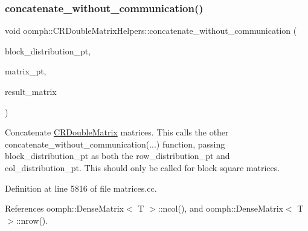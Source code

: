 \subsubsection{\texorpdfstring{concatenate\+\_\+without\+\_\+communication()}{concatenate\_without\_communication()}\hspace{0.1cm}{\footnotesize\ttfamily [2/2]}}
{\footnotesize\ttfamily void oomph\+::\+C\+R\+Double\+Matrix\+Helpers\+::concatenate\+\_\+without\+\_\+communication (\begin{DoxyParamCaption}\item[{const \hyperlink{classoomph_1_1Vector}{Vector}$<$ \hyperlink{classoomph_1_1LinearAlgebraDistribution}{Linear\+Algebra\+Distribution} $\ast$$>$ \&}]{block\+\_\+distribution\+\_\+pt,  }\item[{const \hyperlink{classoomph_1_1DenseMatrix}{Dense\+Matrix}$<$ \hyperlink{classoomph_1_1CRDoubleMatrix}{C\+R\+Double\+Matrix} $\ast$$>$ \&}]{matrix\+\_\+pt,  }\item[{\hyperlink{classoomph_1_1CRDoubleMatrix}{C\+R\+Double\+Matrix} \&}]{result\+\_\+matrix }\end{DoxyParamCaption})}



Concatenate \hyperlink{classoomph_1_1CRDoubleMatrix}{C\+R\+Double\+Matrix} matrices. This calls the other concatenate\+\_\+without\+\_\+communication(...) function, passing block\+\_\+distribution\+\_\+pt as both the row\+\_\+distribution\+\_\+pt and col\+\_\+distribution\+\_\+pt. This should only be called for block square matrices. 



Definition at line 5816 of file matrices.\+cc.



References oomph\+::\+Dense\+Matrix$<$ T $>$\+::ncol(), and oomph\+::\+Dense\+Matrix$<$ T $>$\+::nrow().

\mbox{\label{namespaceoomph_1_1CRDoubleMatrixHelpers_ae3c10e59d5857457c7e34be8e9262035}} 
